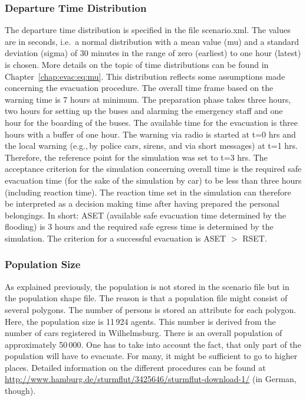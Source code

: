 \subsubsection{Departure Time Distribution}
The departure time distribution is specified in the file scenario.xml. The values are in seconds, i.e.\ a normal distribution with a mean value (mu) and a standard deviation (sigma) of 30 minutes in the range of zero (earliest) to one hour (latest) is chosen. 
More details on the topic of time distributions can be found in Chapter~\ref{chap:evac:eq:mu}. This distribution reflects some assumptions made concerning the evacuation procedure. The overall time frame based on the warning time is 7 hours at minimum. The preparation phase takes three hours, two hours for setting up the buses and alarming the emergency staff and one hour for the boarding of the buses. The available time for the evacuation is three hours with a buffer of one hour. 
The warning via radio is started at t=0 hrs and the local warning (e.g.,\,by police cars, sirens, and via short messages) at t=1 hrs. Therefore, the reference point for the simulation was set to t=3 hrs. The acceptance criterion for the simulation concerning overall time is the required safe evacuation time (for the sake of the simulation by car) to be less than three hours (including reaction time). The reaction time set in the simulation can therefore be interpreted as a decision making time after having prepared the personal belongings. In short: ASET (available safe evacuation time determined by the flooding) is 3 hours and the required safe egress time is determined by the simulation. The criterion for a successful evacuation is ASET $>$ RSET.

\subsubsection{Population Size}
As explained previously, the population is not stored in the scenario file but in the population shape file. The reason is that a population file might consist of several polygons.  The number of persons is stored an attribute for each polygon. Here, the population size is 11\,924 agents. This number is derived from the number of cars registered in Wilhelmsburg. There is an overall population of approximately 50\,000. One has to take into account the fact, that only part of the population will have to evacuate. For many, it might be sufficient to go to higher places. Detailed information on the different procedures can be found at \url{http://www.hamburg.de/sturmflut/3425646/sturmflut-download-1/} (in German, though).

